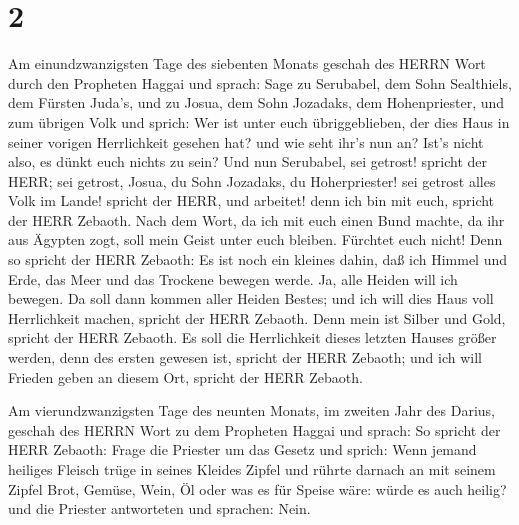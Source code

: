 \hypertarget{section-1}{%
\section{2}\label{section-1}}

 Am einundzwanzigsten Tage des siebenten Monats geschah des
HERRN Wort durch den Propheten Haggai und sprach:  Sage zu
Serubabel, dem Sohn Sealthiels, dem Fürsten Juda's, und zu Josua, dem
Sohn Jozadaks, dem Hohenpriester, und zum übrigen Volk und sprich:
 Wer ist unter euch übriggeblieben, der dies Haus in seiner
vorigen Herrlichkeit gesehen hat? und wie seht ihr's nun an? Ist's nicht
also, es dünkt euch nichts zu sein?  Und nun Serubabel, sei
getrost! spricht der HERR; sei getrost, Josua, du Sohn Jozadaks, du
Hoherpriester! sei getrost alles Volk im Lande! spricht der HERR, und
arbeitet! denn ich bin mit euch, spricht der HERR Zebaoth. 
Nach dem Wort, da ich mit euch einen Bund machte, da ihr aus Ägypten
zogt, soll mein Geist unter euch bleiben. Fürchtet euch nicht!
 Denn so spricht der HERR Zebaoth: Es ist noch ein kleines
dahin, daß ich Himmel und Erde, das Meer und das Trockene bewegen werde.
 Ja, alle Heiden will ich bewegen. Da soll dann kommen aller
Heiden Bestes; und ich will dies Haus voll Herrlichkeit machen, spricht
der HERR Zebaoth.  Denn mein ist Silber und Gold, spricht
der HERR Zebaoth.  Es soll die Herrlichkeit dieses letzten
Hauses größer werden, denn des ersten gewesen ist, spricht der HERR
Zebaoth; und ich will Frieden geben an diesem Ort, spricht der HERR
Zebaoth.

 Am vierundzwanzigsten Tage des neunten Monats, im zweiten
Jahr des Darius, geschah des HERRN Wort zu dem Propheten Haggai und
sprach:  So spricht der HERR Zebaoth: Frage die Priester um
das Gesetz und sprich:  Wenn jemand heiliges Fleisch trüge
in seines Kleides Zipfel und rührte darnach an mit seinem Zipfel Brot,
Gemüse, Wein, Öl oder was es für Speise wäre: würde es auch heilig? und
die Priester antworteten und sprachen: Nein.

